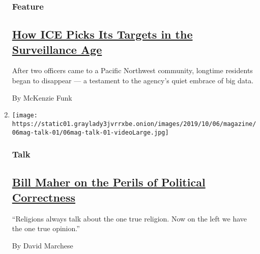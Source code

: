 \begin{enumerate}
  \hypertarget{feature-2}{%
  \subsubsection{Feature}\label{feature-2}}

  \hypertarget{how-ice-picks-its-targets-in-the-surveillance-age}{%
  \subsection{\texorpdfstring{\href{/2019/10/02/magazine/ice-surveillance-deportation.html}{How
  ICE Picks Its Targets in the Surveillance
  Age}}{How ICE Picks Its Targets in the Surveillance Age}}\label{how-ice-picks-its-targets-in-the-surveillance-age}}

  After two officers came to a Pacific Northwest community, longtime
  residents began to disappear --- a testament to the agency's quiet
  embrace of big data.

  By McKenzie Funk
\item
  \texttt{[image: https://static01.graylady3jvrrxbe.onion/images/2019/10/06/magazine/06mag-talk-01/06mag-talk-01-videoLarge.jpg]}

  \hypertarget{talk}{%
  \subsubsection{Talk}\label{talk}}

  \hypertarget{bill-maher-on-the-perils-of-political-correctness}{%
  \subsection{\texorpdfstring{\href{/interactive/2019/09/30/magazine/bill-maher-interview.html}{Bill
  Maher on the Perils of Political
  Correctness}}{Bill Maher on the Perils of Political Correctness}}\label{bill-maher-on-the-perils-of-political-correctness}}

  ``Religions always talk about the one true religion. Now on the left
  we have the one true opinion.''

  By David Marchese
\end{enumerate}

